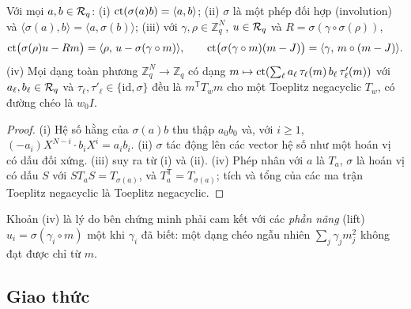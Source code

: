 \begin{lemma}
\label{lem:bin-lin}
Với mọi $a,b\in\mathcal{R}_q$: (i) $\mathrm{ct}(\sigma(a)b)=\langle a,b\rangle$; (ii) $\sigma$ là
một phép đối hợp (involution) và $\langle\sigma(a),b\rangle=\langle a,\sigma(b)\rangle$;
(iii) với $\gamma,\rho\in\mathbb Z_q^N$, $u\in\mathcal{R}_q$ và
$R=\sigma(\gamma\circ\sigma(\rho))$,
\[
\mathrm{ct}\bigl(\sigma(\rho)u-Rm\bigr)=\langle\rho,\,u-\sigma(\gamma\circ m)\rangle,
\qquad
\mathrm{ct}\bigl(\sigma(\gamma\circ m)(m-J)\bigr)=\langle\gamma,\,m\circ(m-J)\rangle .
\]
(iv) Mọi dạng toàn phương $\mathbb Z_q^N\to\mathbb Z_q$ có dạng
$m\mapsto\mathrm{ct}(\sum_\ell a_\ell\,\tau_\ell(m)\,b_\ell\,\tau'_\ell(m))$ với
$a_\ell,b_\ell\in\mathcal{R}_q$ và $\tau_\ell,\tau'_\ell\in\{\mathrm{id},\sigma\}$ đều là
$m^{\mathsf T}T_wm$ cho một Toeplitz negacyclic $T_w$, có đường chéo là
$w_0I$.
\end{lemma}
\begin{proof}
(i) Hệ số hằng của $\sigma(a)b$ thu thập $a_0b_0$ và, với
$i\ge1$, $(-a_i)X^{N-i}\cdot b_iX^i=a_ib_i$. (ii) $\sigma$ tác động lên các
vector hệ số như một hoán vị có dấu đối xứng. (iii) suy ra từ (i) và (ii).
(iv) Phép nhân với $a$ là $T_a$, $\sigma$ là hoán vị có dấu $S$
với $ST_aS=T_{\sigma(a)}$, và $T_a^{\mathsf T}=T_{\sigma(a)}$; tích và tổng
của các ma trận Toeplitz negacyclic là Toeplitz negacyclic.
\end{proof}

Khoản (iv) là lý do bên chứng minh phải cam kết với các \emph{phần nâng} (lift)
$u_i=\sigma(\gamma_i\circ m)$ một khi $\gamma_i$ đã biết: một dạng chéo ngẫu
nhiên $\sum_j\gamma_jm_j^2$ không đạt được chỉ từ $m$.

\subsection{Giao thức}

